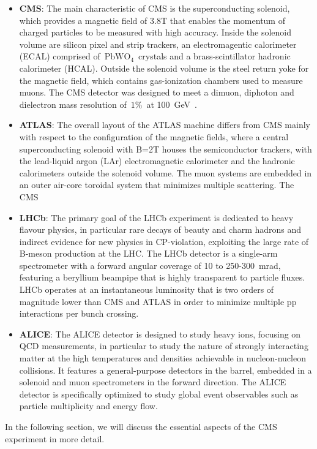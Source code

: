 \begin{itemize}
    \item \textbf{CMS}: The main characteristic of CMS is the superconducting solenoid, which provides a magnetic field of 3.8T that enables the momentum of charged particles to be measured with high accuracy. Inside the solenoid volume are silicon pixel and strip trackers, an electromagentic calorimeter (ECAL) comprised of~$\mathrm{PbWO}_4$~crystals and a brass-scintillator hadronic calorimeter (HCAL). Outside the solenoid volume is the steel return yoke for the magnetic field, which contains gas-ionization chambers used to measure muons. The CMS detector was designed to meet a dimuon, diphoton and dielectron mass resolution of~$1\%$~at 100~GeV~\cite{Chatrchyan:2008aa}.
    \item \textbf{ATLAS}: The overall layout of the ATLAS machine differs from CMS mainly with respect to the configuration of the magnetic fields, where a central superconducting solenoid with B=2T houses the semiconductor trackers, with the lead-liquid argon (LAr) electromagnetic calorimeter and the hadronic calorimeters outside the solenoid volume. The muon systems are embedded in an outer air-core toroidal system that minimizes multiple scattering. The CMS
    \item \textbf{LHCb}: The primary goal of the LHCb experiment is dedicated to heavy flavour physics, in particular rare decays of beauty and charm hadrons and indirect evidence for new physics in CP-violation, exploiting the large rate of B-meson production at the LHC. The LHCb detector is a single-arm spectrometer with a forward angular coverage of 10 to 250-300~mrad, featuring a beryllium beampipe that is highly transparent to particle fluxes. LHCb operates at an instantaneous luminosity that is two orders of magnitude lower than CMS and ATLAS in order to minimize multiple pp interactions per bunch crossing.
    \item \textbf{ALICE}: The ALICE detector is designed to study heavy ions, focusing on QCD measurements, in particular to study the nature of strongly interacting matter at the high temperatures and densities achievable in nucleon-nucleon collisions. It features a general-purpose detectors in the barrel, embedded in a solenoid and muon spectrometers in the forward direction. The ALICE detector is specifically optimized to study global event observables such as particle multiplicity and energy flow. 
\end{itemize}
In the following section, we will discuss the essential aspects of the CMS experiment in more detail.

